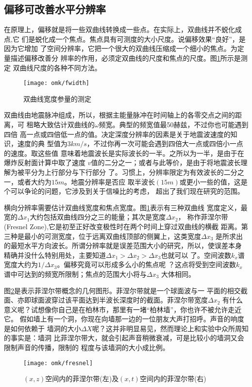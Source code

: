 \subsection{偏移可改善水平分辨率}
在原理上，偏移就是将一些双曲线转换成一些点。在实际上，双曲线并不蜕化成点,它
们是蜕化成一个焦点。焦点具有可测度的大小尺度。说偏移效果“良好”，是因为它增加
了空间分辨率，它把一个很大的双曲线压缩成一个细小的焦点。为定量描述偏移改善分
辨率的作用，必须定双曲线的尺度和焦点的尺度。图\ref{fig:omk/fwidth}所示是测定
双曲线尺度的各种不同方法。
\begin{figure}[H]
\centering
\texttt{[image: omk/fwidth]}
\caption[fwidth]{双曲线宽度参量的测定}
\label{fig:omk/fwidth}
\end{figure}
双曲线由地震脉冲组成，所以，根据主能量脉冲在时间轴上的各零交点之间的距离，可
租略大致估计双曲线的$\omega$频宽。典型的频宽值最50赫兹，不过你也可能遇到四倍
高一点或四倍低一点的值。决定深度分辨率的因素是关于地震波速度的知识，速度的典
型值为$3km/s$，不过你再一次可能会遇到四倍大一点或四倍小一点的速度。取这些值
意味着地震波长是实际波长的一半。之所以为一半，是由于在爆炸反射面计算中取了速度
$v$值的二分之一；或者与此等价，是由于将地震波长理解为被平分为上行部分与下行部分
了。习惯上，分辨率限定为有效波长的二分之一，或者大约为$15m$。地震分辨率是否应
取半波长$(15m)$或更小一些的值，这是个可以争论的问题，它涉及到关于信噪比的考虑，
超出了我们现在研究的范围。

横向分辨率需要估计双曲线宽度和焦点宽度。图\ref{fig:omk/fwidth}表示有三种双曲线
宽度定义，最宽的$\Delta x_{1}$大约包括双曲线四分之三的能量；其次是宽度$\Delta x_{2}$，
称作菲涅尔带(Fresnel Zone),它是初至正好改变极性时在两个时间上穿过双曲线的横截
距离。第三种是最小的可测宽度，位于远离双曲线顶部的侧翼上，这类宽度$\Delta x_{3}$
是所求出的最短水平方向波长。所谓分辨率就是误差范围大小的研究，所以，使误差本身
精确并没什么特别用处，主要知道$\Delta x_{1}>\Delta x_{2}>\Delta x_{3}$也就可以
了。空间波数$k_{x}$谱宽度大约为$1/\Delta x_{3}$。偏移究竟可以形成多么小的焦点呢
？这点将受到空间波数$k_{x}$谱中可达到的频宽所限制；焦点的范围大小将与$\Delta x_{3}$
大体相同。

图\ref{fig:omk/fresnel}是表示菲涅尔带概念的几何图形。菲涅尔带就是一个球面波与一
平面的相交截面、亦即球面波穿过该平面达到半波长深度时的截面。菲涅尔带宽度$\Delta x_{2}$
有什么意义呢？试想像你自己是在柏林市，那里有一堵“柏林墙”，你也许不被允许走近它。
假如墙上有一个洞，你现在向墙那一边的一位朋友大声打招呼。声音的响度是如何依赖于
墙洞的大小$\Delta X$呢？这并非明显易见，然而理论上和实验中众所周知的事实是：墙洞
比菲涅尔带大，就会引起声音稍微衰减，可是比较小的墙洞又会限制声音的传播，限制的
程度与该墙洞的大小成比例。
\begin{figure}[H]
\centering
\texttt{[image: omk/fresnel]}
\caption[fresnel]{$(x,z)$空间内的菲涅尔带(左)及$(x,t)$空间内的菲涅尔带(右)}
\label{fig:omk/fresnel}
\end{figure}

